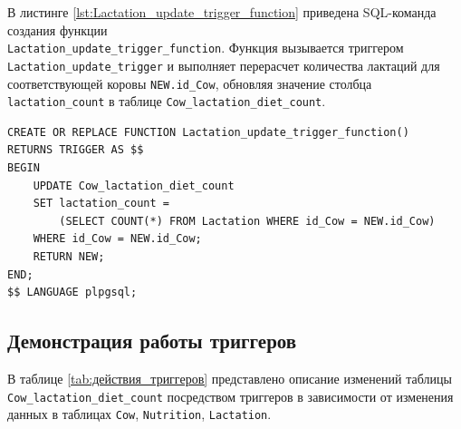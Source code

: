 В листинге \ref{lst:Lactation_update_trigger_function} приведена SQL-команда создания функции
\\\texttt{Lactation\_update\_trigger\_function}.
Функция вызывается триггером \texttt{Lactation\_update\_trigger}
и выполняет перерасчет количества лактаций для соответствующей коровы \texttt{NEW.id\_Cow},
обновляя значение столбца \texttt{lactation\_count} в таблице \texttt{Cow\_lactation\_diet\_count}.

\begin{lstlisting}[caption={Создание функции Lactation\_update\_trigger\_function}, label={lst:Lactation_update_trigger_function}]
CREATE OR REPLACE FUNCTION Lactation_update_trigger_function()
RETURNS TRIGGER AS $$
BEGIN
    UPDATE Cow_lactation_diet_count
    SET lactation_count =
        (SELECT COUNT(*) FROM Lactation WHERE id_Cow = NEW.id_Cow)
    WHERE id_Cow = NEW.id_Cow;
    RETURN NEW;
END;
$$ LANGUAGE plpgsql;
\end{lstlisting}

\subsection{Демонстрация работы триггеров}

В таблице \ref{tab:действия_триггеров} представлено описание изменений 
таблицы \\\texttt{Cow\_lactation\_diet\_count} 
посредством триггеров в зависимости от изменения данных в таблицах \texttt{Cow},
\texttt{Nutrition}, \texttt{Lactation}.

